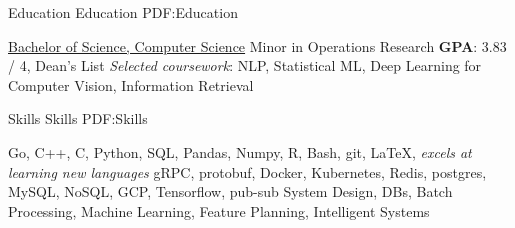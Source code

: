 \documentclass[letterpaper,nonstopmode]{simpleresumecv}
\begin{document}
\begin{Body}

\Section
{Education}
{Education}
{PDF:Education}

\Entry
{}
\hfill \textit{}

\SmallGap
\underline{Bachelor of Science, Computer Science}
\SmallGap
\BulletItem
Minor in Operations Research
\BulletItem
\textbf{GPA}: 3.83 / 4, Dean's List
\SmallGap
\textit{Selected coursework}: NLP, Statistical ML, Deep Learning for Computer Vision, Information Retrieval


\Section
{Skills}
{Skills}
{PDF:Skills}

\BulletItem
Go, C++, C, Python, SQL, Pandas, Numpy, R, Bash, git, {\LaTeX}, \textit{excels at learning new languages}
\BulletItem
gRPC, protobuf, Docker, Kubernetes, Redis, postgres, MySQL, NoSQL, GCP, Tensorflow, pub-sub
\BulletItem
System Design, DBs, Batch Processing, Machine Learning, Feature Planning, Intelligent Systems
\end{Body}
\end{document}

